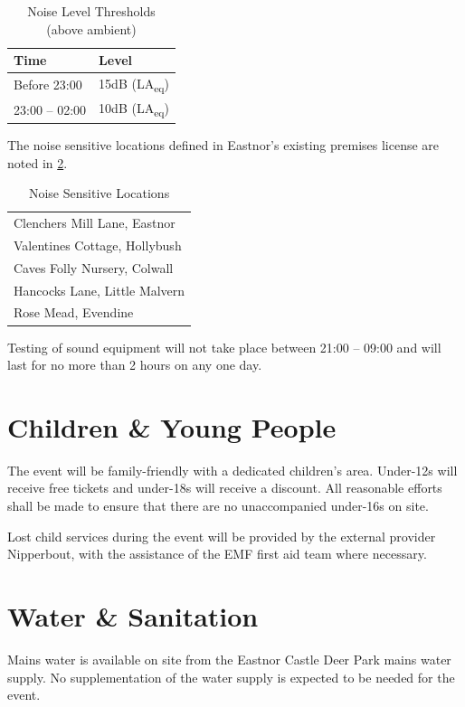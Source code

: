 \begin{table}[h!]
    \caption{Noise Level Thresholds (above ambient)}
    \label{table:noisethresholds}
    \centering
    \begin{tabular}{| l l |}
        \hline
        \textbf{Time} & \textbf{Level} \\
        \hline
        Before 23:00 & 15dB (LA\textsubscript{eq}) \\
        23:00 -- 02:00 & 10dB (LA\textsubscript{eq}) \\
        \hline
    \end{tabular}
\end{table}


The noise sensitive locations defined in Eastnor's existing premises license
are noted in \cref{table:noiselocations}.

\begin{table}[h!]
    \caption{Noise Sensitive Locations}
    \label{table:noiselocations}
    \centering
    \begin{tabular}{| l |}
        \hline
      Clenchers Mill Lane, Eastnor \\
      Valentines Cottage, Hollybush \\
      Caves Folly Nursery, Colwall \\
      Hancocks Lane, Little Malvern \\
      Rose Mead, Evendine \\
        \hline
    \end{tabular}
\end{table}

Testing of sound equipment will not take place between 21:00 -- 09:00 and
will last for no more than 2 hours on any one day.

\section{Children \& Young People}

The event will be family-friendly with a dedicated children's area. Under-12s will receive free
tickets and under-18s will receive a discount. All reasonable efforts shall be made to ensure
that there are no unaccompanied under-16s on site.

Lost child services during the event will be provided by the external provider Nipperbout, with the
assistance of the EMF first aid team where necessary.

\section{Water \& Sanitation}\label{water}
Mains water is available on site from the Eastnor Castle Deer Park mains water supply. No 
supplementation of the water supply is expected to be needed for the event.

